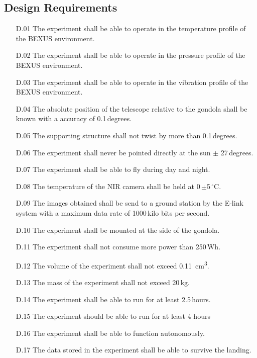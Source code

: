 \subsection{Design Requirements}

\begin{enumerate}
	\item[D.01] The experiment shall be able to operate in the temperature profile of the BEXUS environment.
	\item[D.02] The experiment shall be able to operate in the pressure profile of the BEXUS environment.
    \item[D.03] The experiment shall be able to operate in the vibration profile of the BEXUS environment.
    \item[D.04] The absolute position of the telescope relative to the gondola shall be known with a accuracy of 0.1\,degrees.
	\item[D.05] The supporting structure shall not twist by more than 0.1\,degrees.
	\item[D.06] The experiment shall never be pointed directly at the sun $\pm$ 27\,degrees.
	\item[D.07] The experiment shall be able to fly during day and night.
	\item[D.08] The temperature of the NIR camera shall be held at 0\,$\pm$5\,$^\circ$C.
	\item[D.09] The images obtained shall be send to a ground station by the E-link system with a maximum data rate of 1000\,kilo bits per second.
	\item[D.10] The experiment shall be mounted at the side of the gondola.
	\item[D.11] The experiment shall not consume more power than 250\,Wh.
    \item[D.12] The volume of the experiment shall not exceed \SI{0.11}{cm\cubed}.
    \item[D.13] The mass of the experiment shall not exceed 20\,kg.
    \item[D.14] The experiment shall be able to run for at least 2.5\,hours.
    \item [D.15] The experiment should be able to run for at least 4 hours
    \item[D.16] The experiment shall be able to function autonomously.
    \item[D.17] The data stored in the experiment shall be able to survive the landing.
\end{enumerate}